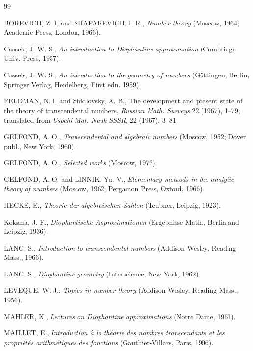 
\begin{thebibliography}{99}
	\setlength{\itemsep}{3pt plus 1pt minus 1pt}   %
	\setlength{\parsep}{1pt plus 0.5pt}            %
	\small                                         %

	 BOREVICH, Z. I. and SHAFAREVICH, I. R., \textit{Number theory} (Moscow, 1964; Academic Press, London, 1966).

	 Cassels, J. W. S., \textit{An introduction to Diophantine approximation} (Cambridge Univ. Press, 1957).

	 Cassels, J. W. S., \textit{An introduction to the geometry of numbers} (G{\"o}ttingen, Berlin; Springer Verlag, Heidelberg, First edn. 1959).

	 FELDMAN, N. I. and Shidlovsky, A. B., The development and present state of the theory of transcendental numbers, \textit{Russian Math. Surveys} 22 (1967), 1--79; translated from \textit{Uspehi Mat. Nauk SSSR}, 22 (1967), 3--81.

	 GELFOND, A. O., \textit{Transcendental and algebraic numbers} (Moscow, 1952; Dover publ., New York, 1960).

	 GELFOND, A. O., \textit{Selected works} (Moscow, 1973).

	 GELFOND, A. O. and LINNIK, Yu. V., \textit{Elementary methods in the analytic theory of numbers} (Moscow, 1962; Pergamon Press, Oxford, 1966).

	 HECKE, E., \textit{Theorie der algebraischen Zahlen} (Teubner, Leipzig, 1923).

	 Koksma, J. F., \textit{Diophantische Approximationen} (Ergebnisse Math., Berlin and Leipzig, 1936).

	 LANG, S., \textit{Introduction to transcendental numbers} (Addison-Wesley, Reading Mass., 1966).

	 LANG, S., \textit{Diophantine geometry} (Interscience, New York, 1962).

	 LEVEQUE, W. J., \textit{Topics in number theory} (Addison-Wesley, Reading Mass., 1956).

	 MAHLER, K., \textit{Lectures on Diophantine approximations} (Notre Dame, 1961).

	 MAILLET, E., \textit{Introduction {\`a} la th{\'e}orie des nombres transcendants et les propri{\'e}t{\'e}s arithm{\'e}tiques des fonctions} (Gauthier-Villars, Paris, 1906).


\end{thebibliography}
